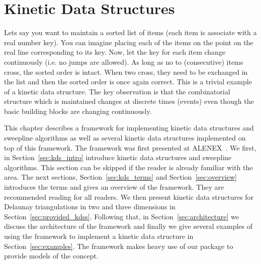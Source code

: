 
\chapter{Kinetic Data Structures}
\label{chapter-kds}
\minitoc



\def\note#1{$\langle\langle${\bf #1}$\rangle\rangle$}


%

Lets say you want to maintain a sorted list of items (each item is
associate with a real number key). You can imagine placing each of the
items on the point on the real line corresponding to its key. Now, let
the key for each item change continuously (i.e. no jumps are allowed).
As long as no to (consecutive) items cross, the sorted order is
intact. When two cross, they need to be exchanged in the list and then
the sorted order is once again correct. This is a trivial example of a
kinetic data structure. The key observation is that the combinatorial
structure which is maintained changes at discrete times (events) even
though the basic building blocks are changing continuously.

This chapter describes a framework for implementing kinetic data
structures and sweepline algorithms as well as several kinetic data
structures implemented on top of this framework. The framework was
first presented at ALENEX~\cite{cgal:gkr-cfhm-04}. We first, in
Section~\ref{sec:kds_intro} introduce kinetic data structures and
sweepline algorithms. This section can be skipped if the reader is
already familiar with the area. The next sections,
Section~\ref{sec:kds_terms} and Section~\ref{sec:overview} introduces
the terms and gives an overview of the framework. They are recommended
reading for all readers. We then present kinetic data structures for
Delaunay triangulations in two and three dimensions in
Section~\ref{sec:provided_kdss}. Following that, in
Section~\ref{sec:architecture} we discuss the architecture of the
framework and finally we give several examples of using the framework
to implement a kinetic data structure in
Section~\ref{sec:examples}. The framework makes heavy use of our
 package to provide models of the
 concept.

